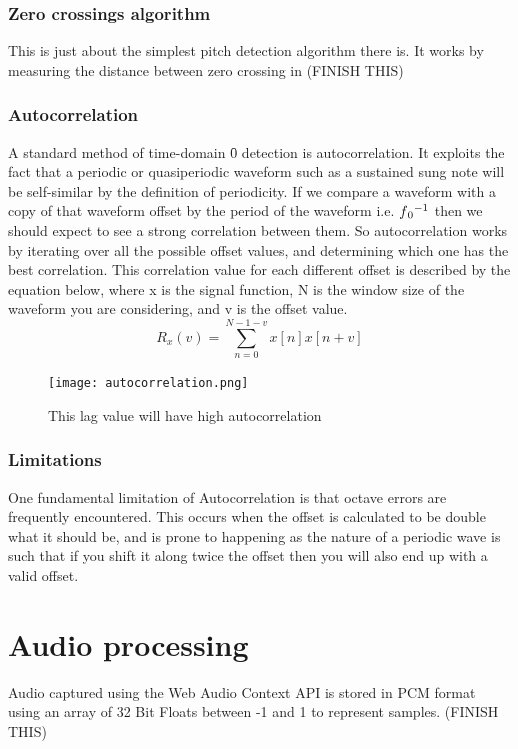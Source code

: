 		\subsubsection{Zero crossings algorithm}
		This is just about the simplest pitch detection algorithm there is. It works by measuring the distance between zero crossing in (FINISH THIS)
		\subsubsection{Autocorrelation}
		A standard method of time-domain \f0 detection is autocorrelation. It exploits the fact that a periodic or quasiperiodic waveform such as a sustained sung note will be self-similar by the definition of periodicity. If we compare a waveform with a copy of that waveform offset by the period of the waveform i.e. \(\f0 ^{-1}\) then we should expect to see a strong correlation between them. So autocorrelation works by iterating over all the possible offset values, and determining which one has the best correlation. This correlation value for each different offset is described by the equation below, where x is the signal function, N is the window size of the waveform you are considering, and v is the offset value.  \[R_x(v) = \sum_{n=0}^{N-1-v} x[n]x[n+v]\]
		\begin{figure}
			\centering
			\texttt{[image: autocorrelation.png]}
			\caption{This lag value will have high autocorrelation}
		\end{figure}

		\subsubsection{Limitations}
		One fundamental limitation of Autocorrelation is that octave errors are frequently encountered. This occurs when the offset is calculated to be double what it should be, and is prone to happening as the nature of a periodic wave is such that if you shift it along twice the offset then you will also end up with a valid offset.
	
\section{Audio processing}
	Audio captured using the Web Audio Context API is stored in PCM format using an array of 32 Bit Floats between -1 and 1 to represent samples. (FINISH THIS)

